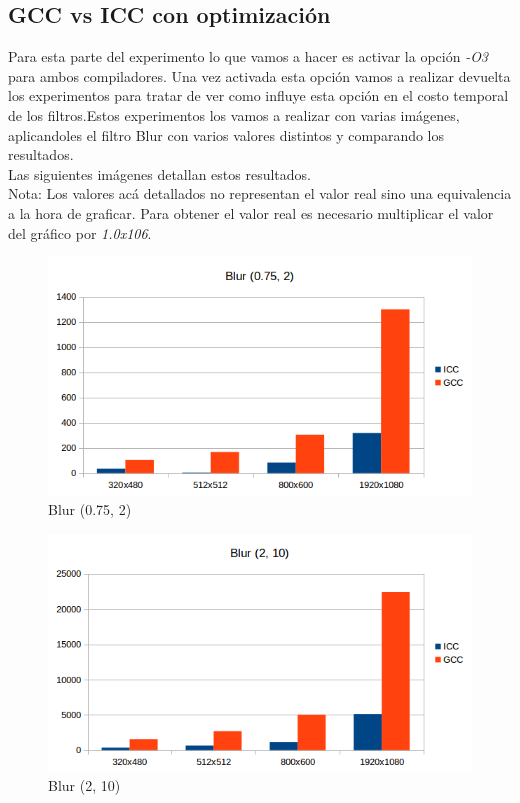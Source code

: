 \subsection{GCC vs ICC con optimización }

Para esta parte del experimento lo que vamos a hacer es activar la opción \textit{-O3} para ambos compiladores. Una vez activada esta opción vamos a realizar devuelta los experimentos para tratar de ver como influye esta opción en el costo temporal de los filtros.Estos experimentos los vamos a realizar con varias imágenes, aplicandoles el filtro Blur con varios valores distintos y comparando los resultados.\\
Las siguientes imágenes detallan estos resultados.\\
Nota: Los valores acá detallados no representan el valor real sino una equivalencia a la hora de graficar. Para obtener el valor real es necesario multiplicar el valor del gráfico por \textit{1.0x106}.\\


\begin{figure}[H]
\begin{center}
  \includegraphics[width=\linewidth]{cachecompiladores/blur0752.png}
  \caption{{\small Blur (0.75, 2)}} 
\endminipage
\end{center}
\end{figure}

\begin{figure}[H]
\begin{center}
  \includegraphics[width=\linewidth]{cachecompiladores/blur210.png}
  \caption{{\small Blur (2, 10)}} 
\endminipage
\end{center}
\end{figure}


